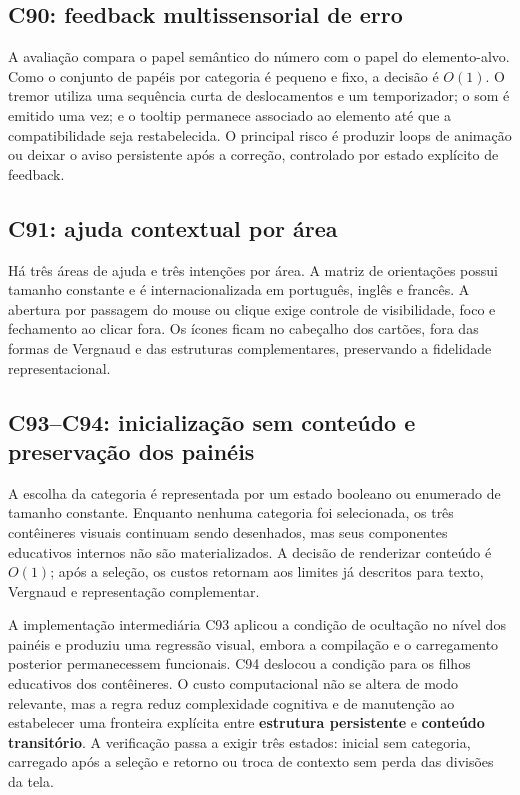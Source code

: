 \documentclass[12pt,a4paper]{article}
\begin{document}
\subsection{C90: feedback multissensorial de erro}
A avaliação compara o papel semântico do número com o papel do elemento-alvo. Como o conjunto de papéis por categoria é pequeno e fixo, a decisão é $O(1)$. O tremor utiliza uma sequência curta de deslocamentos e um temporizador; o som é emitido uma vez; e o tooltip permanece associado ao elemento até que a compatibilidade seja restabelecida. O principal risco é produzir loops de animação ou deixar o aviso persistente após a correção, controlado por estado explícito de feedback.

\subsection{C91: ajuda contextual por área}
Há três áreas de ajuda e três intenções por área. A matriz de orientações possui tamanho constante e é internacionalizada em português, inglês e francês. A abertura por passagem do mouse ou clique exige controle de visibilidade, foco e fechamento ao clicar fora. Os ícones ficam no cabeçalho dos cartões, fora das formas de Vergnaud e das estruturas complementares, preservando a fidelidade representacional.


\subsection{C93--C94: inicialização sem conteúdo e preservação dos painéis}
A escolha da categoria é representada por um estado booleano ou enumerado de tamanho constante. Enquanto nenhuma categoria foi selecionada, os três contêineres visuais continuam sendo desenhados, mas seus componentes educativos internos não são materializados. A decisão de renderizar conteúdo é $O(1)$; após a seleção, os custos retornam aos limites já descritos para texto, Vergnaud e representação complementar.

A implementação intermediária C93 aplicou a condição de ocultação no nível dos painéis e produziu uma regressão visual, embora a compilação e o carregamento posterior permanecessem funcionais. C94 deslocou a condição para os filhos educativos dos contêineres. O custo computacional não se altera de modo relevante, mas a regra reduz complexidade cognitiva e de manutenção ao estabelecer uma fronteira explícita entre \textbf{estrutura persistente} e \textbf{conteúdo transitório}. A verificação passa a exigir três estados: inicial sem categoria, carregado após a seleção e retorno ou troca de contexto sem perda das divisões da tela.
\end{document}
